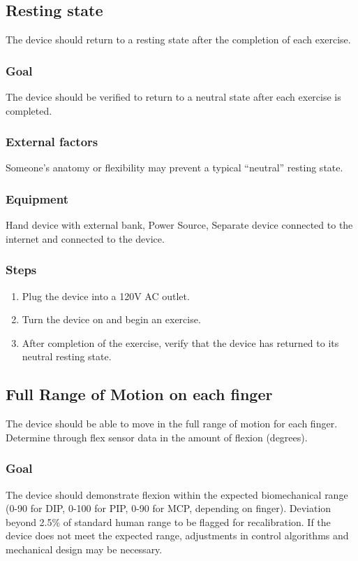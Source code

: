 \documentclass{article}
\begin{document}
\subsection{Resting state}
The device should return to a resting state after the completion of each exercise.

\subsubsection{Goal} The device should be verified to return to a neutral state after each exercise is completed.

\subsubsection{External factors} Someone’s anatomy or flexibility may prevent a typical “neutral” resting state.

\subsubsection{Equipment} Hand device with external bank, Power Source, Separate device connected to the internet and connected to the device.

\subsubsection{Steps}
\begin{enumerate}
\item Plug the device into a 120V AC outlet.
\item Turn the device on and begin an exercise.
\item After completion of the exercise, verify that the device has returned to its neutral resting state.
\end{enumerate}

\subsection{Full Range of Motion on each finger}
The device should be able to move in the full range of motion for each finger. Determine through flex sensor data in the amount of flexion (degrees).

\subsubsection{Goal} The device should demonstrate flexion within the expected biomechanical range (0-90 for DIP, 0-100 for PIP, 0-90 for MCP, depending on finger). Deviation beyond 2.5\% of standard human range to be flagged for recalibration. If the device does not meet the expected range, adjustments in control algorithms and mechanical design may be necessary.
\end{document}
